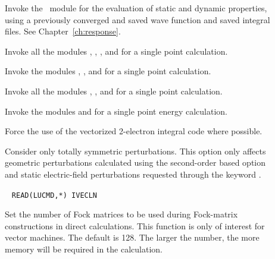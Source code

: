 \begin{description}
\item[]

Invoke the \resp\ module for the evaluation of static and dynamic
properties, using a previously converged and saved wave function and saved integral files. See Chapter~\ref{ch:response}.

\item[]

Invoke all the modules {\her}, {\sir}, {\resp}, and {\aba} for a single point
     calculation.

\item[]

Invoke the modules {\her}, {\sir}, and {\aba} for a single point
calculation.

\item[]

Invoke all the modules {\her}, {\sir}, and {\resp} for a single point
calculation.

\item[]

Invoke the modules {\her} and {\sir} for a single point energy calculation.


\item[] Force the use of the vectorized 2-electron integral code {\eri} where possible.



\item[] Consider only totally symmetric
perturbations.
This option only affects geometric perturbations calculated using the
second-order based  option and static
electric-field perturbations requested through the keyword .

\item[]\verb| |
\newline
\verb|READ(LUCMD,*) IVECLN|

Set the number of Fock matrices to be used during Fock-matrix constructions in
direct calculations. This function is only of interest for vector machines.
The default is 128. The larger the number, the more memory will be required
in the calculation.


\end{description}
